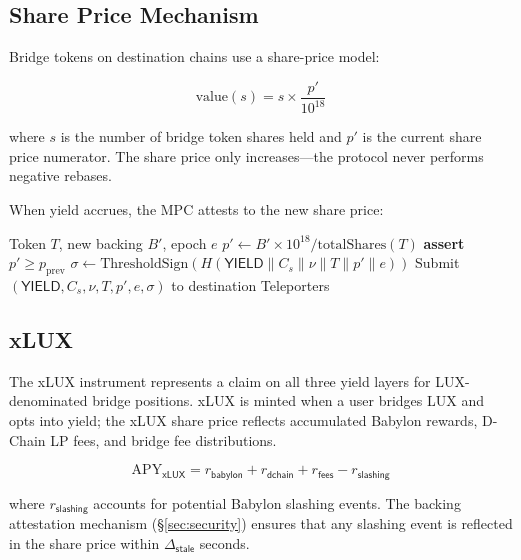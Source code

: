 \documentclass[11pt]{article}
\begin{document}
\subsection{Share Price Mechanism}

Bridge tokens on destination chains use a share-price model:

\begin{equation}
  \mathrm{value}(s) = s \times \frac{p'}{10^{18}}
\end{equation}

where $s$ is the number of bridge token shares held and $p'$ is the current share price numerator. The share price only increases---the protocol never performs negative rebases.

When yield accrues, the MPC attests to the new share price:

\begin{algorithm}[H]
\caption{Yield Attestation}
\begin{algorithmic}[1]
\Require Token $T$, new backing $B'$, epoch $e$
\State $p' \leftarrow B' \times 10^{18} / \mathrm{totalShares}(T)$
\State \textbf{assert} $p' \geq p_{\mathrm{prev}}$ 
\State $\sigma \leftarrow \mathrm{ThresholdSign}(H(\mathsf{YIELD} \| C_s \| \nu \| T \| p' \| e))$
\State Submit $(\mathsf{YIELD}, C_s, \nu, T, p', e, \sigma)$ to destination Teleporters
\end{algorithmic}
\end{algorithm}

\subsection{xLUX}

The xLUX instrument represents a claim on all three yield layers for LUX-denominated bridge positions. xLUX is minted when a user bridges LUX and opts into yield; the xLUX share price reflects accumulated Babylon rewards, D-Chain LP fees, and bridge fee distributions.

\begin{equation}
  \mathrm{APY}_{\mathsf{xLUX}} = r_{\mathsf{babylon}} + r_{\mathsf{dchain}} + r_{\mathsf{fees}} - r_{\mathsf{slashing}}
\end{equation}

where $r_{\mathsf{slashing}}$ accounts for potential Babylon slashing events. The backing attestation mechanism (\S\ref{sec:security}) ensures that any slashing event is reflected in the share price within $\Delta_{\mathsf{stale}}$ seconds.
\end{document}
